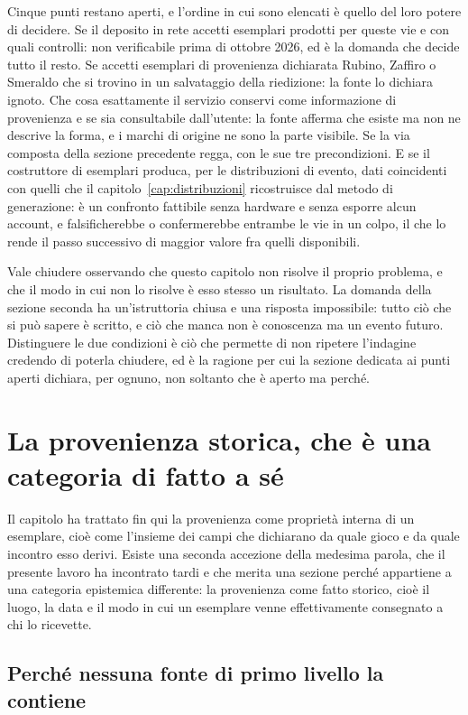 Cinque punti restano aperti, e l'ordine in cui sono elencati è quello del loro potere di decidere. Se il deposito in rete accetti esemplari prodotti per queste vie e con quali controlli: non verificabile prima di ottobre 2026, ed è la domanda che decide tutto il resto. Se accetti esemplari di provenienza dichiarata Rubino, Zaffiro o Smeraldo che si trovino in un salvataggio della riedizione: la fonte lo dichiara ignoto. Che cosa esattamente il servizio conservi come informazione di provenienza e se sia consultabile dall'utente: la fonte afferma che esiste ma non ne descrive la forma, e i marchi di origine ne sono la parte visibile. Se la via composta della sezione precedente regga, con le sue tre precondizioni. E se il costruttore di esemplari produca, per le distribuzioni di evento, dati coincidenti con quelli che il capitolo~\ref{cap:distribuzioni} ricostruisce dal metodo di generazione: è un confronto fattibile senza hardware e senza esporre alcun account, e falsificherebbe o confermerebbe entrambe le vie in un colpo, il che lo rende il passo successivo di maggior valore fra quelli disponibili.

Vale chiudere osservando che questo capitolo non risolve il proprio problema, e che il modo in cui non lo risolve è esso stesso un risultato. La domanda della sezione seconda ha un'istruttoria chiusa e una risposta impossibile: tutto ciò che si può sapere è scritto, e ciò che manca non è conoscenza ma un evento futuro. Distinguere le due condizioni è ciò che permette di non ripetere l'indagine credendo di poterla chiudere, ed è la ragione per cui la sezione dedicata ai punti aperti dichiara, per ognuno, non soltanto che è aperto ma perché.
\section{La provenienza storica, che è una categoria di fatto a sé}

Il capitolo ha trattato fin qui la provenienza come proprietà interna di un esemplare, cioè come l'insieme dei campi che dichiarano da quale gioco e da quale incontro esso derivi. Esiste una seconda accezione della medesima parola, che il presente lavoro ha incontrato tardi e che merita una sezione perché appartiene a una categoria epistemica differente: la provenienza come fatto storico, cioè il luogo, la data e il modo in cui un esemplare venne effettivamente consegnato a chi lo ricevette.

\subsection*{Perché nessuna fonte di primo livello la contiene}

